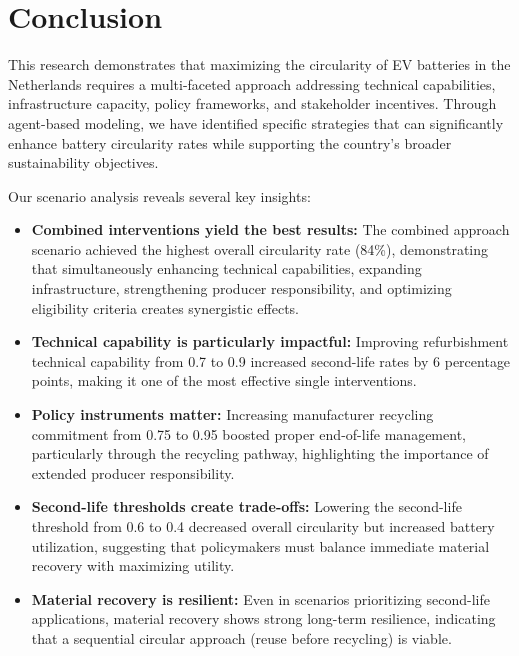 \section{Conclusion}
This research demonstrates that maximizing the circularity of EV batteries in the Netherlands requires a multi-faceted approach addressing technical capabilities, infrastructure capacity, policy frameworks, and stakeholder incentives. Through agent-based modeling, we have identified specific strategies that can significantly enhance battery circularity rates while supporting the country's broader sustainability objectives.

Our scenario analysis reveals several key insights:

\begin{itemize}
  \item \textbf{Combined interventions yield the best results:} The combined approach scenario achieved the highest overall circularity rate (84\%), demonstrating that simultaneously enhancing technical capabilities, expanding infrastructure, strengthening producer responsibility, and optimizing eligibility criteria creates synergistic effects.
  
  \item \textbf{Technical capability is particularly impactful:} Improving refurbishment technical capability from 0.7 to 0.9 increased second-life rates by 6 percentage points, making it one of the most effective single interventions.
  
  \item \textbf{Policy instruments matter:} Increasing manufacturer recycling commitment from 0.75 to 0.95 boosted proper end-of-life management, particularly through the recycling pathway, highlighting the importance of extended producer responsibility.
  
  \item \textbf{Second-life thresholds create trade-offs:} Lowering the second-life threshold from 0.6 to 0.4 decreased overall circularity but increased battery utilization, suggesting that policymakers must balance immediate material recovery with maximizing utility.
  
  \item \textbf{Material recovery is resilient:} Even in scenarios prioritizing second-life applications, material recovery shows strong long-term resilience, indicating that a sequential circular approach (reuse before recycling) is viable.
\end{itemize}

